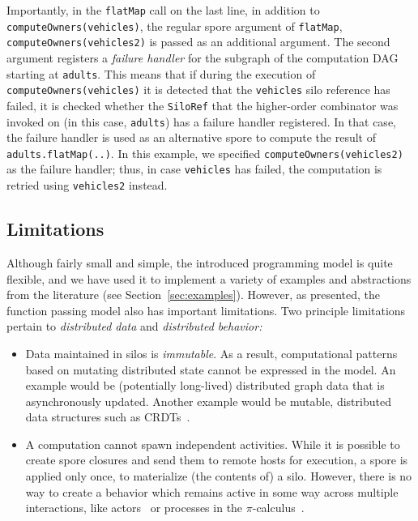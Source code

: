 \documentclass{jfp1}
\begin{document}
Importantly, in the \verb|flatMap| call on the last line, in addition to
\verb|computeOwners(vehicles)|, the regular spore argument of \verb|flatMap|,
\verb|computeOwners(vehicles2)| is passed as an additional argument. The second
argument registers a {\em failure handler} for the subgraph of the computation
DAG starting at \verb|adults|. This means that if during the execution of
\verb|computeOwners(vehicles)| it is detected that the \verb|vehicles| silo
reference has failed, it is checked whether the \verb|SiloRef| that the
higher-order combinator was invoked on (in this case, \verb|adults|) has a
failure handler registered. In that case, the failure handler is used as an
alternative spore to compute the result of \verb|adults.flatMap(..)|. In this
example, we specified \verb|computeOwners(vehicles2)| as the failure handler;
thus, in case \verb|vehicles| has failed, the computation is retried using
\verb|vehicles2| instead.

\subsection{Limitations}

Although fairly small and simple, the introduced programming model is
quite flexible, and we have used it to implement a variety of examples
and abstractions from the literature (see Section~\ref{sec:examples}).
However, as presented, the function passing model also has important
limitations. Two principle limitations pertain to {\em distributed
  data} and {\em distributed behavior:}

\begin{itemize}

\item Data maintained in silos is {\em immutable}. As a result,
  computational patterns based on mutating distributed state cannot be
  expressed in the model. An example would be (potentially long-lived)
  distributed graph data that is asynchronously updated.  Another
  example would be mutable, distributed data structures such as
  CRDTs~\cite{ShapiroPBZ11}.

\item A computation cannot spawn independent activities. While it is
  possible to create spore closures and send them to remote hosts for
  execution, a spore is applied only once, to materialize (the
  contents of) a silo. However, there is no way to create a behavior
  which remains active in some way across multiple interactions, like
  actors~\cite{Actors} or processes in the
  $\pi$-calculus~\cite{milner:92a}.

\end{itemize}
\end{document}
